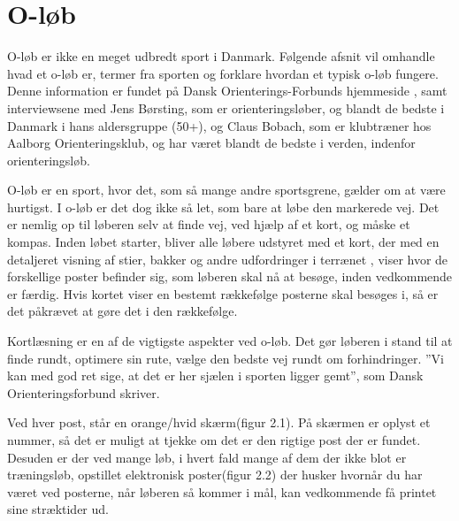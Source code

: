\section{O-løb}
O-løb er ikke en meget udbredt sport i Danmark. Følgende afsnit vil omhandle hvad et o-løb er, termer fra sporten og forklare hvordan et typisk o-løb fungere. Denne information er fundet på Dansk Orienterings-Forbunds hjemmeside \citep{DOF}, samt interviewsene med Jens Børsting, som er orienteringsløber, og blandt de bedste i Danmark i hans aldersgruppe (50+), og Claus Bobach, som er klubtræner hos Aalborg Orienteringsklub, og har været blandt de bedste i verden, indenfor orienteringsløb.

O-løb er en sport, hvor det, som så mange andre sportsgrene, gælder om at være hurtigst. I o-løb er det dog ikke så let, som bare at løbe den markerede vej. Det er nemlig op til løberen selv at finde vej, ved hjælp af et kort, og måske et kompas. Inden løbet starter, bliver alle løbere udstyret med et kort, der med en detaljeret visning af stier, bakker og andre udfordringer i terrænet , viser hvor de forskellige poster befinder sig, som løberen skal nå at besøge, inden vedkommende er færdig. Hvis kortet viser en bestemt rækkefølge posterne skal besøges i, så er det påkrævet at gøre det i den rækkefølge. 

Kortlæsning er en af de vigtigste aspekter ved o-løb. Det gør løberen i stand til at finde rundt, optimere sin rute, vælge den bedste vej rundt om forhindringer. ”Vi kan med god ret sige, at det er her sjælen i sporten ligger gemt”, som Dansk Orienteringsforbund skriver.   

Ved hver post, står en  orange/hvid skærm(figur 2.1). På skærmen er oplyst et nummer, så det er muligt at tjekke om det er den rigtige post der er fundet. Desuden er der ved mange løb, i hvert fald mange af dem der ikke blot er træningsløb, opstillet elektronisk poster(figur 2.2) der husker hvornår du har været ved posterne, når løberen så kommer i mål, kan vedkommende få printet sine stræktider ud.

